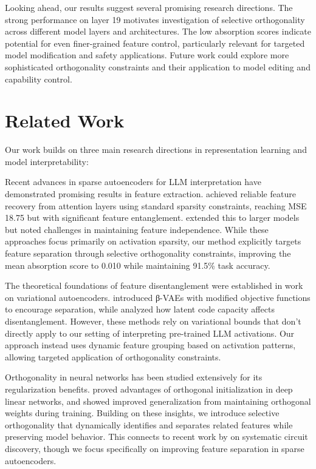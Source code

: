 \documentclass{article} %
\begin{document}
Looking ahead, our results suggest several promising research directions. The strong performance on layer 19 motivates investigation of selective orthogonality across different model layers and architectures. The low absorption scores indicate potential for even finer-grained feature control, particularly relevant for targeted model modification and safety applications. Future work could explore more sophisticated orthogonality constraints and their application to model editing and capability control.

\section{Related Work}
\label{sec:related}

Our work builds on three main research directions in representation learning and model interpretability:

Recent advances in sparse autoencoders for LLM interpretation have demonstrated promising results in feature extraction. \cite{Kissane2024InterpretingAL} achieved reliable feature recovery from attention layers using standard sparsity constraints, reaching MSE 18.75 but with significant feature entanglement. \cite{Gao2024ScalingAE} extended this to larger models but noted challenges in maintaining feature independence. While these approaches focus primarily on activation sparsity, our method explicitly targets feature separation through selective orthogonality constraints, improving the mean absorption score to 0.010 while maintaining 91.5\% task accuracy.

The theoretical foundations of feature disentanglement were established in work on variational autoencoders. \cite{Higgins2017betaVAELB} introduced β-VAEs with modified objective functions to encourage separation, while \cite{Burgess2018UnderstandingDI} analyzed how latent code capacity affects disentanglement. However, these methods rely on variational bounds that don't directly apply to our setting of interpreting pre-trained LLM activations. Our approach instead uses dynamic feature grouping based on activation patterns, allowing targeted application of orthogonality constraints.

Orthogonality in neural networks has been studied extensively for its regularization benefits. \cite{Hu2020ProvableBO} proved advantages of orthogonal initialization in deep linear networks, and \cite{Li2019OrthogonalDN} showed improved generalization from maintaining orthogonal weights during training. Building on these insights, we introduce selective orthogonality that dynamically identifies and separates related features while preserving model behavior. This connects to recent work by \cite{Conmy2023TowardsAC} on systematic circuit discovery, though we focus specifically on improving feature separation in sparse autoencoders.
\end{document}
